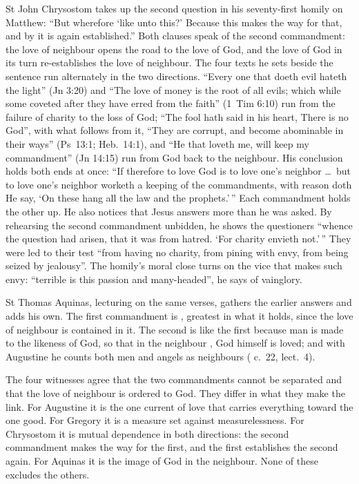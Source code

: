 St John Chrysostom takes up the second question in his seventy-first homily
on Matthew: ``But wherefore `like unto this?' Because this makes the way for
that, and by it is again established.'' Both clauses speak of the second
commandment: the love of neighbour opens the road to the love of God, and the
love of God in its turn re-establishes the love of neighbour. The four texts he
sets beside the sentence run alternately in the two directions. ``Every one
that doeth evil hateth the light'' (Jn 3:20) and ``The love of money is the
root of all evils; which while some coveted after they have erred from the
faith'' (1~Tim 6:10) run from the failure of charity to the loss of God;
``The fool hath said in his heart, There is no God'', with what follows from
it, ``They are corrupt, and become abominable in their ways'' (Ps~13:1;
Heb.\ 14:1), and ``He that loveth me, will keep my commandment'' (Jn 14:15)
run from God back to the neighbour. His conclusion holds both ends at once: ``If therefore to love
God is to love one's neighbor \dots\ but to love one's neighbor worketh a
keeping of the commandments, with reason doth He say, `On these hang all the
law and the prophets.'\,'' Each commandment holds the other up.
He also notices that Jesus answers more than he was asked. By rehearsing the
second commandment unbidden, he shows the questioners ``whence the question had
arisen, that it was from hatred. `For charity envieth not.'\,'' They were led
to their test ``from having no charity, from pining with envy, from being
seized by jealousy''. The homily's moral close turns on the vice that makes
such envy: ``terrible is this passion and many-headed'', he says of
vainglory.

St Thomas Aquinas, lecturing on the same verses, gathers the earlier answers
and adds his own. The first commandment is , greatest in
what it holds, since the love of neighbour is contained in it. The second is
like the first because man is made to the likeness of God, so that in the
neighbour , God himself is loved; and with
Augustine he counts both men and angels as neighbours (
c.~22, lect.~4).

The four witnesses agree that the two commandments cannot be separated and
that the love of neighbour is ordered to God. They differ in what they make the
link. For Augustine it is the one current of love that carries everything
toward the one good. For Gregory it is a measure set against measurelessness.
For Chrysostom it is mutual dependence in both directions: the second
commandment makes the way for the first, and the first establishes the second
again. For Aquinas it is the image of God in the neighbour. None of these
excludes the others.

